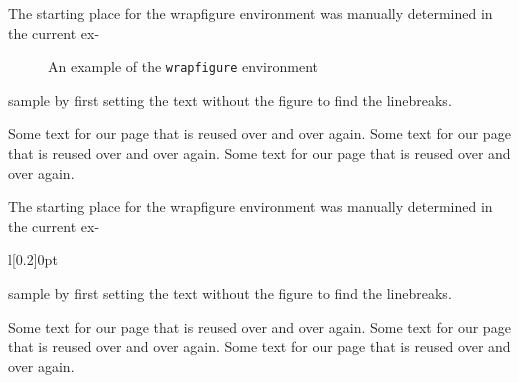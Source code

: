 \documentclass{tlc2/ttctexa}
\newcommand\sample{Some text for our page
 that is reused over and over again. }
\begin{document}
The starting place for the wrapfigure
environment was manually determined in
the current ex-
\begin{figure}
  \centering
  \caption{An example of the
    \texttt{wrapfigure} environment}
\end{figure}
sample by first setting the text without
the figure to find the linebreaks.

\sample \sample \sample

\clearpage

The starting place for the wrapfigure
environment was manually determined in
the current ex-
\begin{wrapdiagram}[7]{l}[0.2\width]{0pt}
  \centering
  \caption{An example of the
    \texttt{wrapdiagram} environment}
\end{wrapdiagram}
sample by first setting the text without
the figure to find the linebreaks.

\sample \sample \sample
\end{document}
